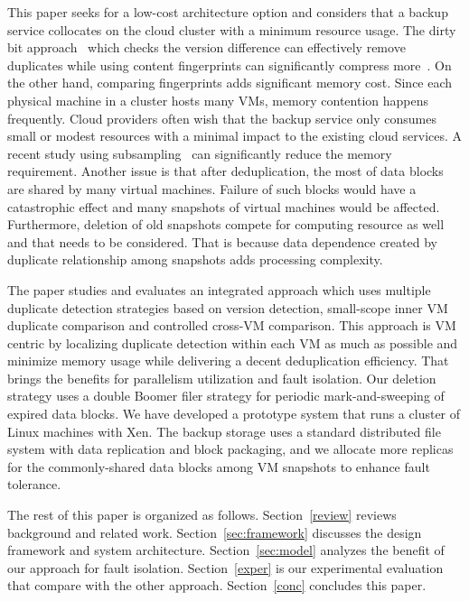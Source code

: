 This paper seeks for a low-cost architecture option and considers that
a backup service collocates  on  the cloud cluster with a minimum resource usage. 
The dirty bit approach~\cite{??}  which checks the version difference can effectively remove
duplicates while using content fingerprints can significantly compress more~\cite{Bottlneck08}.
On the other hand, comparing fingerprints  adds significant  memory cost. 
Since each physical machine in a cluster  hosts many VMs, memory contention happens frequently.
Cloud providers often wish that the backup service only consumes  small or modest resources
with a minimal impact to the existing cloud services.  A 
recent study using subsampling~\cite{Guo2011}  can significantly reduce the memory requirement.
Another issue is that after deduplication, the most of data blocks are shared by many virtual machines.
Failure of such blocks would  have a catastrophic effect and many snapshots of virtual machines would be affected.
Furthermore, 
deletion of old snapshots compete for computing resource as well and that  needs
to be considered. That is  because data dependence created
by duplicate relationship among snapshots  adds processing complexity.

The paper studies and evaluates  an integrated approach which uses  multiple duplicate detection strategies
based on  version  detection, small-scope inner VM duplicate comparison
and controlled cross-VM comparison. 
This approach is VM centric by localizing duplicate detection within each VM  as much as possible
and minimize memory usage while delivering a decent deduplication efficiency. 
That brings the benefits for parallelism  utilization and fault isolation.
Our deletion strategy uses a double Boomer filer strategy for periodic mark-and-sweeping of expired data blocks.
We have developed a prototype system that runs a cluster of Linux machines with Xen.
The backup storage uses a standard distributed file system  with data replication and block packaging,
and we allocate more  replicas for the commonly-shared  data blocks among VM snapshots to enhance fault tolerance.



The rest of this paper is organized as follows.
Section~\ref{review} reviews background and related work.
Section~\ref{sec:framework}  discusses the  design framework and system architecture.
Section~\ref{sec:model}  analyzes the benefit of our approach for fault isolation. 
Section~\ref{exper} is our experimental evaluation that compare with the other approach.
Section~\ref{conc}  concludes this paper.

